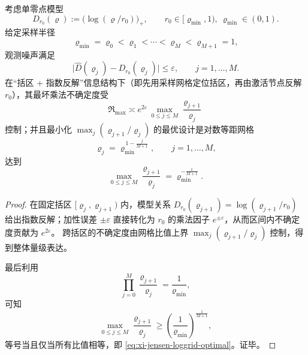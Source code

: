 \begin{theorem}[单零点缺陷模型下的对数网格极值最优性]\label{thm:xi-singlezero-jensen-loggrid-minimax}
考虑单零点模型
\[
D_{r_0}(\varrho):=\bigl(\log(\varrho/r_0)\bigr)_+,\qquad r_0\in[\varrho_{\min},1),\ \varrho_{\min}\in(0,1).
\]
给定采样半径
\[
\varrho_{\min}=\varrho_0<\varrho_1<\cdots<\varrho_M<\varrho_{M+1}=1,
\]
观测噪声满足
\[
\bigl|\widehat D(\varrho_j)-D_{r_0}(\varrho_j)\bigr|\le \varepsilon,\qquad j=1,\dots,M.
\]
在“括区 + 指数反解”信息结构下（即先用采样网格定位括区，再由激活节点反解 \(r_0\)），其最坏乘法不确定度受
\[
\mathfrak R_{\max}\asymp e^{2\varepsilon}\,
\max_{0\le j\le M}\frac{\varrho_{j+1}}{\varrho_j}
\]
控制；并且最小化
\(
\max_j(\varrho_{j+1}/\varrho_j)
\)
的最优设计是对数等距网格
\begin{equation}\label{eq:xi-jensen-loggrid-optimal}
\varrho_j=\varrho_{\min}^{\,1-\frac{j}{M+1}},\qquad j=1,\dots,M,
\end{equation}
达到
\begin{equation}\label{eq:xi-jensen-loggrid-optimal-ratio}
\max_{0\le j\le M}\frac{\varrho_{j+1}}{\varrho_j}
=\varrho_{\min}^{-\frac{1}{M+1}}.
\end{equation}
\end{theorem}
\begin{proof}
在固定括区 \([\varrho_j,\varrho_{j+1})\) 内，模型关系
\(
D_{r_0}(\varrho_{j+1})=\log(\varrho_{j+1}/r_0)
\)
给出指数反解；加性误差 \(\pm\varepsilon\) 直接转化为 \(r_0\) 的乘法因子 \(e^{\pm\varepsilon}\)，从而区间内不确定度贡献为 \(e^{2\varepsilon}\)。
跨括区的不确定度由网格比值上界
\(
\max_j(\varrho_{j+1}/\varrho_j)
\)
控制，得到整体量级表达。

最后利用
\[
\prod_{j=0}^{M}\frac{\varrho_{j+1}}{\varrho_j}
=\frac{1}{\varrho_{\min}},
\]
可知
\[
\max_{0\le j\le M}\frac{\varrho_{j+1}}{\varrho_j}
\ge \left(\frac{1}{\varrho_{\min}}\right)^{\frac{1}{M+1}},
\]
等号当且仅当所有比值相等，即 \eqref{eq:xi-jensen-loggrid-optimal}。证毕。
\end{proof}


